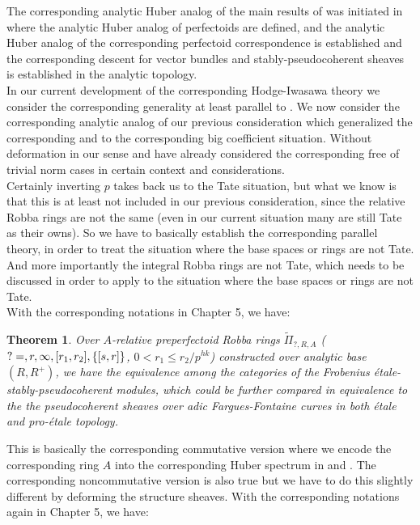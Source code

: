\documentclass[12pt]{amsart}
\newtheorem{theorem}{Theorem}[section]
\theoremstyle{definition}
\numberwithin{equation}{section}
\begin{document}
\indent The corresponding analytic Huber analog of the main results of \cite{KL1} was initiated in \cite{Ked1} where the analytic Huber analog of perfectoids are defined, and the analytic Huber analog of the corresponding perfectoid correspondence is established and the corresponding descent for vector bundles and stably-pseudocoherent sheaves is established in the analytic topology.\\


\indent In our current development of the corresponding Hodge-Iwasawa theory we consider the corresponding generality at least parallel to \cite{Ked1}. We now consider the corresponding analytic analog of our previous consideration which generalized the corresponding \cite{KL1} and \cite{KL2} to the corresponding big coefficient situation. Without deformation in our sense \cite{KL1} and \cite{KL2} have already considered the corresponding free of trivial norm cases in certain context and considerations. \\


\indent Certainly inverting $p$ takes back us to the Tate situation, but what we know is that this is at least not included in our previous consideration, since the relative Robba rings are not the same (even in our current situation many are still Tate as their owns). So we have to basically establish the corresponding parallel theory, in order to treat the situation where the base spaces or rings are not Tate. And more importantly the integral Robba rings are not Tate, which needs to be discussed in order to apply to the situation where the base spaces or rings are not Tate. \\



\indent With the corresponding notations in Chapter 5, we have:


\begin{theorem}
Over $A$-relative preperfectoid Robba rings $\widetilde{\Pi}_{?,R,A}$ ($?=\empty,r,\infty,[r_1,r_2],\{[s,r]\}$, $0<r_1\leq r_2/p^{hk}$)  constructed over analytic base $(R,R^+)$, we have the equivalence among the categories of the Frobenius \'etale-stably-pseudocoherent modules, which could be further compared in equivalence to the the pseudocoherent sheaves over adic Fargues-Fontaine curves in both \'etale and pro-\'etale topology.	
\end{theorem}


\indent This is basically the corresponding commutative version where we encode the corresponding ring $A$ into the corresponding Huber spectrum in \cite{KL1} and \cite{KL2}. The corresponding noncommutative version is also true but we have to do this slightly different by deforming the structure sheaves.  With the corresponding notations again in Chapter 5, we have:
\end{document}

